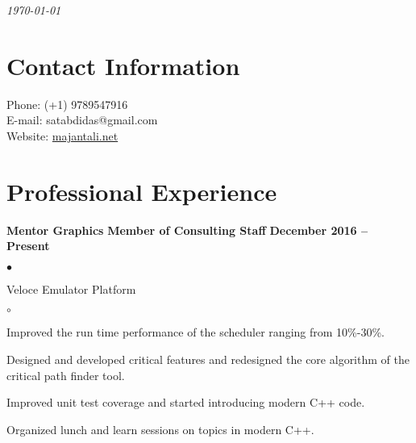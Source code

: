 \documentclass[margin,line]{res}
\newenvironment{list1}{
  \begin{list}{$\bullet$}{%
      \setlength{\itemsep}{0in}
      \setlength{\parsep}{0in} \setlength{\parskip}{0in}
      \setlength{\topsep}{0in} \setlength{\partopsep}{0in}
      \setlength{\leftmargin}{0.17in}}}{\end{list}}
\newenvironment{list2}{
  \begin{list}{$\circ$}{%
      \setlength{\itemsep}{0in}
      \setlength{\parsep}{0in} \setlength{\parskip}{0in}
      \setlength{\topsep}{0in} \setlength{\partopsep}{0in}
      \setlength{\leftmargin}{0.2in}}}{\end{list}}
\begin{document}
 \hfill {\em \today}

\begin{resume}
\section{\sc Contact Information}

\vspace{.05in}
Phone:  (+1) 9789547916\\
E-mail:  satabdidas@gmail.com\\
Website: \url{majantali.net}



\section{\sc Professional Experience}
{\bf   Mentor Graphics}
\hfill {\bf Member of Consulting Staff}
\hfill{\bf December 2016 -- Present}
\vspace{.05in}
\begin{list1} %
	\item Veloce Emulator Platform
	\begin{list2}
		\item Improved the run time performance of the scheduler ranging from 10\%-30\%.
		\item Designed and developed critical features and redesigned the core algorithm of the critical path finder tool.
		\item Improved unit test coverage and started introducing modern C++ code.
		\item Organized lunch and learn sessions on topics in modern C++.	
	\end{list2}
\end{list1}


\end{resume}
\end{document}
